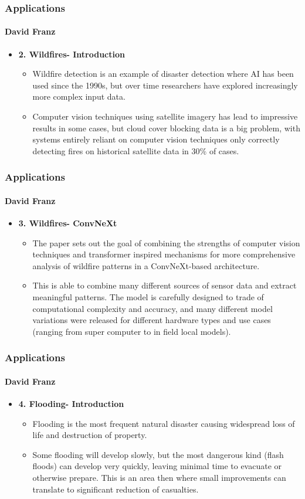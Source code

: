 \documentclass{beamer}
\newcommand{\namedframe}[3]{
  \begin{frame}
    \frametitle{#2}
    \framesubtitle{#1}
    #3
  \end{frame}
}
\begin{document}
\namedframe{David Franz}{Applications}{
\begin{itemize}
    \item \textbf{2. Wildfires- Introduction}
    \begin{itemize}
        \item Wildfire detection is an example of disaster detection where AI has been used since the 1990s, but over time researchers have explored increasingly more complex input data.
        \item Computer vision techniques using satellite imagery has lead to impressive results in some cases, but cloud cover blocking data is a big problem, with systems entirely reliant on computer vision techniques only correctly detecting fires on historical satellite data in 30\% of cases.
    \end{itemize}
\end{itemize}
}

\namedframe{David Franz}{Applications}{
\begin{itemize}
    \item \textbf{3. Wildfires- ConvNeXt}
    \begin{itemize}
        \item The paper sets out the goal of combining the strengths of computer vision techniques and transformer inspired mechanisms for more comprehensive analysis of wildfire patterns in a ConvNeXt-based architecture. 
        \item This is able to combine many different sources of sensor data and extract meaningful patterns. The model is carefully designed to trade of computational complexity and accuracy, and many different model variations were released for different hardware types and use cases (ranging from super computer to in field local models).
    \end{itemize}
\end{itemize}
}

\namedframe{David Franz}{Applications}{
\begin{itemize}
    \item \textbf{4. Flooding- Introduction}
    \begin{itemize}
        \item Flooding is the most frequent natural disaster causing widespread loss of life and destruction of property. 
        \item Some flooding will develop slowly, but the most dangerous kind (flash floods) can develop very quickly, leaving minimal time to evacuate or otherwise prepare. This is an area then where small improvements can translate to significant reduction of casualties. 
    \end{itemize}
\end{itemize}
}
\end{document}
